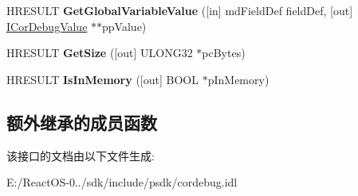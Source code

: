 \begin{DoxyCompactItemize}
\item 
\mbox{\label{interface_i_cor_debug_module_aa29da1944521b83e4c79d30797c2ee5f}} 
H\+R\+E\+S\+U\+LT {\bfseries Get\+Global\+Variable\+Value} (\mbox{[}in\mbox{]} md\+Field\+Def field\+Def, \mbox{[}out\mbox{]} \hyperlink{interface_i_cor_debug_value}{I\+Cor\+Debug\+Value} $\ast$$\ast$pp\+Value)
\item 
\mbox{\label{interface_i_cor_debug_module_aa7c97bbedcd1af70a7d0a3dad7dea4c3}} 
H\+R\+E\+S\+U\+LT {\bfseries Get\+Size} (\mbox{[}out\mbox{]} U\+L\+O\+N\+G32 $\ast$pc\+Bytes)
\item 
\mbox{\label{interface_i_cor_debug_module_a25cd5da20b09e1a636ed9257ee412f4a}} 
H\+R\+E\+S\+U\+LT {\bfseries Is\+In\+Memory} (\mbox{[}out\mbox{]} B\+O\+OL $\ast$p\+In\+Memory)
\end{DoxyCompactItemize}
\subsection*{额外继承的成员函数}


该接口的文档由以下文件生成\+:\begin{DoxyCompactItemize}
\item 
E\+:/\+React\+O\+S-\/0../sdk/include/psdk/cordebug.\+idl\end{DoxyCompactItemize}
